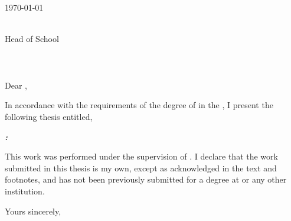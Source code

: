 \documentclass[thesis.tex]{subfiles}
\begin{document}
\ifstrict

\makeatletter
\vspace*{10mm}
\begin{flushright}
    \@author\\
    \@email\\
    \today
\end{flushright}
\vspace*{10mm}
\begin{flushleft}
    \@hod\\
    Head of School\\
    \@department\\
    \@university\\
    \@address\\
    \bigskip\bigskip\bigskip
    Dear \@hod,
    \bigskip
\end{flushleft}

\noindent In accordance with the requirements of the degree of \@degree in the \@department, I present the following thesis entitled,

\begin{center}
\bigskip
\textbf{\emph{\@title:\\\@subtitle}}
\bigskip
\end{center}

\noindent This work was performed under the supervision of \@supervisor. I declare that the work submitted in this thesis is my own, except as acknowledged in the text and footnotes, and has not been previously submitted for a degree at \@university or any other institution.

\begin{flushright}
    \bigskip
    Yours sincerely,\\\vspace{0.5in}
    \@author
\end{flushright}
\makeatother
\cleardoublepage

\fi
\end{document}
